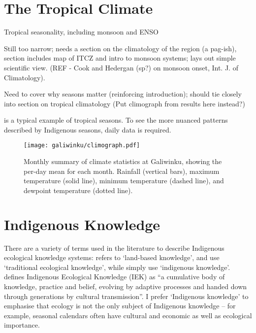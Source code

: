 \section{The Tropical Climate}

Tropical seasonality, including monsoon and ENSO

Still too narrow; needs a section on the climatology of the region (a pag-ish),
section includes map of ITCZ and intro to monsoon systems; lays out simple scientific view.
(REF - Cook and Hedergan (sp?) on monsoon onset, Int. J. of Climatology).

Need to cover why seasons matter (reinforcing introduction); should tie
closely into section on tropical climatology (Put climograph from results here instead?)



 is a typical example of tropical seasons.
To see the more nuanced patterns described by Indigenous seasons, daily data is required.

\begin{figure}[h]
    \centering
    \texttt{[image: galiwinku/climograph.pdf]}
    \caption[Monthly Climograph for Galiwinku]{
        Monthly summary of climate statistics at Galiwinku, showing the per-day
        mean for each month.  Rainfall (vertical bars), maximum temperature
        (solid line), minimum temperature (dashed line), and  dewpoint
        temperature (dotted line).}
    \label{fig:galiwinku-climograph}
\end{figure}


\section{Indigenous Knowledge}

There are a variety of terms used in the literature to describe Indigenous
ecological knowledge systems:  \citet{clarke2009} refers to `land-based knowledge',
\citet{petheram2010} and \citet{turner2009} use `traditional ecological
knowledge', while \citet{cochran2015} simply use `indigenous knowledge'.
\citet{berkes2012} defines Indigenous Ecological Knowledge (IEK) as ``a cumulative
body of knowledge, practice and belief, evolving by adaptive processes and
handed down through generations by cultural transmission''.  I prefer
`Indigenous knowledge' to emphasise that ecology is not the only subject of
Indigenous knowledge – for example, seasonal calendars often have cultural and
economic as well as ecological importance.

